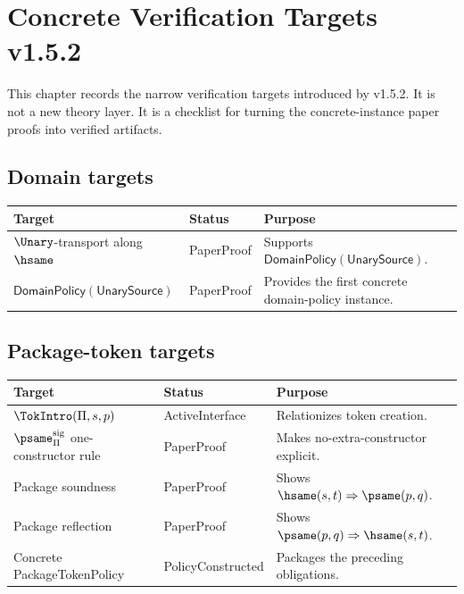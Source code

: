 
\chapter{Concrete Verification Targets v1.5.2}
\label{ch:v152-verification-targets}

This chapter records the narrow verification targets introduced by v1.5.2. It is not a new theory layer. It is a checklist for turning the concrete-instance paper proofs into verified artifacts.

\section{Domain targets}
\begin{longtable}{p{}p{}p{}}
\toprule
\textbf{Target} & \textbf{Status} & \textbf{Purpose}\\
\midrule
\(\Unary\)-transport along \(\hsame\) & PaperProof & Supports \(\mathsf{DomainPolicy}(\mathsf{UnarySource})\).\\
\(\mathsf{DomainPolicy}(\mathsf{UnarySource})\) & PaperProof & Provides the first concrete domain-policy instance.\\
\bottomrule
\end{longtable}

\section{Package-token targets}
\begin{longtable}{p{}p{}p{}}
\toprule
\textbf{Target} & \textbf{Status} & \textbf{Purpose}\\
\midrule
\(\TokIntro(\Pi,s,p)\) & ActiveInterface & Relationizes token creation.\\
\(\psame_{\Pi}^{\mathrm{sig}}\) one-constructor rule & PaperProof & Makes no-extra-constructor explicit.\\
Package soundness & PaperProof & Shows \(\hsame(s,t)\Rightarrow\psame(p,q)\).\\
Package reflection & PaperProof & Shows \(\psame(p,q)\Rightarrow\hsame(s,t)\).\\
Concrete PackageTokenPolicy & PolicyConstructed & Packages the preceding obligations.\\
\bottomrule
\end{longtable}

